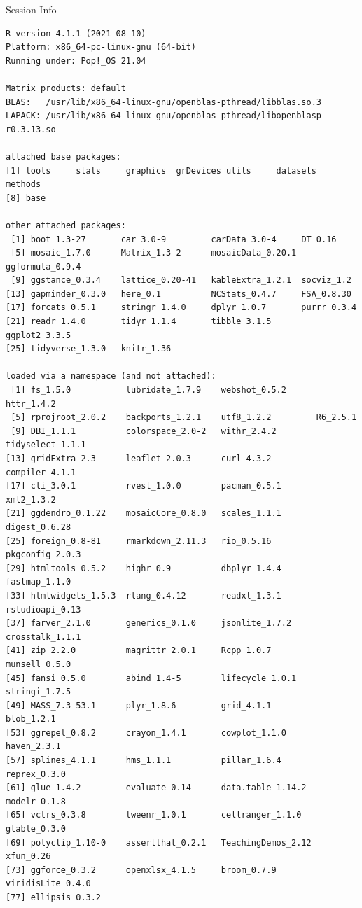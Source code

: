 \documentclass[10pt,handout]{beamer}\usepackage[]{graphicx}\usepackage[]{color}
\makeatletter
\newenvironment{kframe}{%
 \def\at@end@of@kframe{}%
 \ifinner\ifhmode%
  \def\at@end@of@kframe{\end{minipage}}%
  \begin{minipage}{\columnwidth}%
 \fi\fi%
 \def\FrameCommand##1{\hskip\@totalleftmargin \hskip-\fboxsep
 \colorbox{shadecolor}{##1}\hskip-\fboxsep
     \hskip-\linewidth \hskip-\@totalleftmargin \hskip\columnwidth}%
 \MakeFramed {\advance\hsize-\width
   \@totalleftmargin\z@ \linewidth\hsize
   \@setminipage}}%
 {\par\unskip\endMakeFramed%
 \at@end@of@kframe}
\newenvironment{knitrout}{}{} %
\makeatother
\begin{document}
\begin{frame}[fragile]{Session Info}
	\tiny
	
\begin{knitrout}\tiny
{}\color{fgcolor}\begin{kframe}
\begin{verbatim}
R version 4.1.1 (2021-08-10)
Platform: x86_64-pc-linux-gnu (64-bit)
Running under: Pop!_OS 21.04

Matrix products: default
BLAS:   /usr/lib/x86_64-linux-gnu/openblas-pthread/libblas.so.3
LAPACK: /usr/lib/x86_64-linux-gnu/openblas-pthread/libopenblasp-r0.3.13.so

attached base packages:
[1] tools     stats     graphics  grDevices utils     datasets  methods  
[8] base     

other attached packages:
 [1] boot_1.3-27       car_3.0-9         carData_3.0-4     DT_0.16          
 [5] mosaic_1.7.0      Matrix_1.3-2      mosaicData_0.20.1 ggformula_0.9.4  
 [9] ggstance_0.3.4    lattice_0.20-41   kableExtra_1.2.1  socviz_1.2       
[13] gapminder_0.3.0   here_0.1          NCStats_0.4.7     FSA_0.8.30       
[17] forcats_0.5.1     stringr_1.4.0     dplyr_1.0.7       purrr_0.3.4      
[21] readr_1.4.0       tidyr_1.1.4       tibble_3.1.5      ggplot2_3.3.5    
[25] tidyverse_1.3.0   knitr_1.36       

loaded via a namespace (and not attached):
 [1] fs_1.5.0           lubridate_1.7.9    webshot_0.5.2      httr_1.4.2        
 [5] rprojroot_2.0.2    backports_1.2.1    utf8_1.2.2         R6_2.5.1          
 [9] DBI_1.1.1          colorspace_2.0-2   withr_2.4.2        tidyselect_1.1.1  
[13] gridExtra_2.3      leaflet_2.0.3      curl_4.3.2         compiler_4.1.1    
[17] cli_3.0.1          rvest_1.0.0        pacman_0.5.1       xml2_1.3.2        
[21] ggdendro_0.1.22    mosaicCore_0.8.0   scales_1.1.1       digest_0.6.28     
[25] foreign_0.8-81     rmarkdown_2.11.3   rio_0.5.16         pkgconfig_2.0.3   
[29] htmltools_0.5.2    highr_0.9          dbplyr_1.4.4       fastmap_1.1.0     
[33] htmlwidgets_1.5.3  rlang_0.4.12       readxl_1.3.1       rstudioapi_0.13   
[37] farver_2.1.0       generics_0.1.0     jsonlite_1.7.2     crosstalk_1.1.1   
[41] zip_2.2.0          magrittr_2.0.1     Rcpp_1.0.7         munsell_0.5.0     
[45] fansi_0.5.0        abind_1.4-5        lifecycle_1.0.1    stringi_1.7.5     
[49] MASS_7.3-53.1      plyr_1.8.6         grid_4.1.1         blob_1.2.1        
[53] ggrepel_0.8.2      crayon_1.4.1       cowplot_1.1.0      haven_2.3.1       
[57] splines_4.1.1      hms_1.1.1          pillar_1.6.4       reprex_0.3.0      
[61] glue_1.4.2         evaluate_0.14      data.table_1.14.2  modelr_0.1.8      
[65] vctrs_0.3.8        tweenr_1.0.1       cellranger_1.1.0   gtable_0.3.0      
[69] polyclip_1.10-0    assertthat_0.2.1   TeachingDemos_2.12 xfun_0.26         
[73] ggforce_0.3.2      openxlsx_4.1.5     broom_0.7.9        viridisLite_0.4.0 
[77] ellipsis_0.3.2    
\end{verbatim}
\end{kframe}
\end{knitrout}
	
\end{frame}
\end{document}
